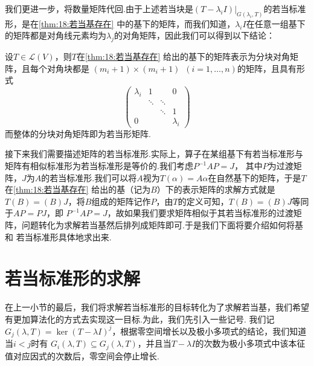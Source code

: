 我们更进一步，将数量矩阵代回.由于上述若当块是$(T-\lambda_iI)\vert_{G(\lambda_i,T)}$的若当标准形，是在\autoref{thm:18:若当基存在}
中的基下的矩阵，而我们知道，$\lambda_iI$在任意一组基下的矩阵都是对角线元素均为$\lambda_j$的对角矩阵，因此我们可以得到以下结论：
\begin{theorem}
    设$T\in \mathcal{L}(V)$，则$T$在\autoref{thm:18:若当基存在} 给出的基下的矩阵表示为分块对角矩阵，且每个对角块都是
    $(m_i+1)\times(m_i+1)\enspace(i=1,\ldots,n)$的矩阵，且具有形式\[\begin{pmatrix}
        \lambda_i & 1 &  & 0 \\  & \ddots & \ddots &  \\  &  &  \ddots & 1 \\ 0 &  &  & \lambda_i
    \end{pmatrix}\]而整体的分块对角矩阵即为若当形矩阵.
\end{theorem}

接下来我们需要描述矩阵的若当标准形.实际上，算子在某组基下有若当标准形与矩阵有相似标准形为若当标准形是等价的.我们考虑$P^{-1}AP=J$，
其中$P$为过渡矩阵，$J$为$A$的若当标准形.我们可以将$A$视为$T(\alpha)=A\alpha$在自然基下的矩阵，于是$T$在\autoref{thm:18:若当基存在}
给出的基（记为$B$）下的表示矩阵的求解方式就是$T(B)=(B)J$，将$B$组成的矩阵记作$P$，由$T$的定义可知，$T(B)=(B)J$等同于$AP=PJ$，即
$P^{-1}AP=J$，故如果我们要求矩阵相似于其若当标准形的过渡矩阵，问题转化为求解若当基然后排列成矩阵即可.于是我们下面将要介绍如何将基和
若当标准形具体地求出来.

\section{若当标准形的求解}
在上一小节的最后，我们将求解若当标准形的目标转化为了求解若当基，我们希望有更加算法化的方式去实现这一目标.为此，我们先引入一些记号.
我们记$G_j(\lambda,T)=\ker (T-\lambda I)^j$，根据零空间增长以及极小多项式的结论，我们知道当$i<j$时有
$G_i(\lambda,T)\subseteq G_j(\lambda,T)$，并且当$T-\lambda I$的次数为极小多项式中该本征值对应因式的次数后，零空间会停止增长.


